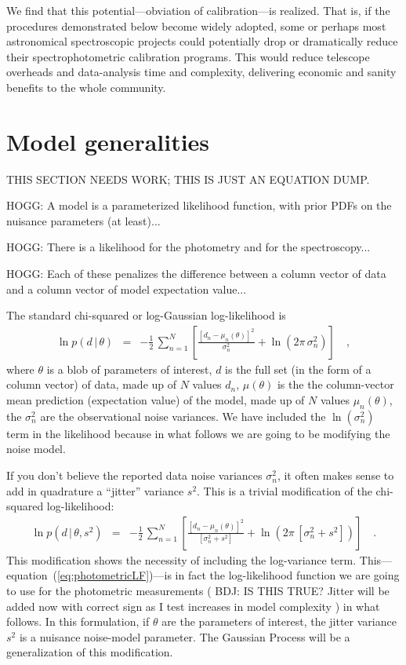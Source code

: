 \documentclass[iop,numberedappendix]{emulateapj}
\newcommand{\given}{\,|\,}
\begin{document}
We find that this potential---obviation of calibration---is realized.
That is, if the procedures demonstrated below become widely adopted,
some or perhaps most astronomical spectroscopic projects could
potentially drop or dramatically reduce their spectrophotometric
calibration programs.
This would reduce telescope overheads and data-analysis time and
complexity, delivering economic and sanity benefits to the whole
community.

\section{Model generalities}

THIS SECTION NEEDS WORK; THIS IS JUST AN EQUATION DUMP.

HOGG: A model is a parameterized likelihood function, with prior PDFs on the nuisance parameters (at least)...

HOGG: There is a likelihood for the photometry and for the spectroscopy...

HOGG: Each of these penalizes the difference between a column vector of data and a column vector of model expectation value...

The standard chi-squared or log-Gaussian log-likelihood is
\begin{eqnarray}
\ln p(d\given\theta) &=& -\frac{1}{2}\,\sum_{n=1}^N \left[\frac{[d_n - \mu_n(\theta)]^2}{\sigma_n^2} + \ln(2\pi\,\sigma_n^2) \right]
\quad ,
\end{eqnarray}
where $\theta$ is a blob of parameters of interest,
$d$ is the full set (in the form of a column vector) of data,
made up of $N$ values $d_n$,
$\mu(\theta)$ is the the column-vector mean prediction (expectation value) of the model,
made up of $N$ values $\mu_n(\theta)$,
the $\sigma_n^2$ are the observational noise variances.
We have included the $\ln(\sigma_n^2)$ term in the likelihood because
in what follows we are going to be modifying the noise model.

If you don't believe the reported data noise variances $\sigma_n^2$,
it often makes sense to add in quadrature a ``jitter'' variance $s^2$.
This is a trivial modification of the chi-squared log-likelihood:
\begin{eqnarray}\label{eq:photometricLF}
\ln p(d\given\theta,s^2) &=& -\frac{1}{2}\,\sum_{n=1}^N \left[\frac{[d_n - \mu_n(\theta)]^2}{[\sigma_n^2 + s^2]} + \ln(2\pi\,[\sigma_n^2 + s^2]) \right]
\quad .
\end{eqnarray}
This modification shows the necessity of including the log-variance
term.
This---equation~(\ref{eq:photometricLF})---is in fact the
log-likelihood function we are going to use for the photometric
measurements ({\color{blue} BDJ: IS THIS TRUE?} {\color{red} Jitter
will be added now with correct sign as I test increases in model
complexity }) in what follows.  
In this formulation, if $\theta$ are the parameters of interest, the
jitter variance $s^2$ is a nuisance noise-model parameter.  The
Gaussian Process will be a generalization of this modification.
\end{document}
